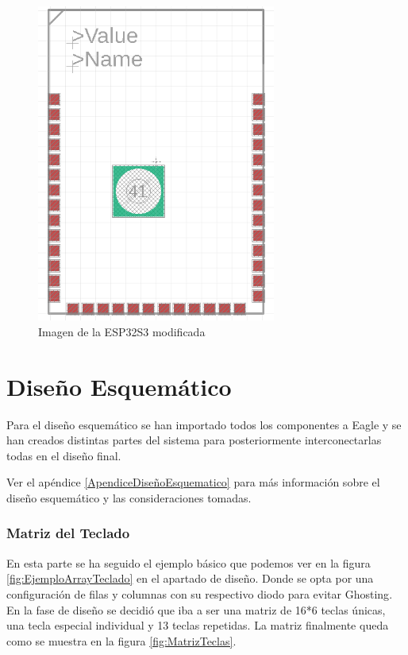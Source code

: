 \begin{figure}[H]
    \centering
    \includegraphics[width=0.7\textwidth]{imagenes/Capitulos/Cap04/ESP32S3HOLE.png}
    \caption{Imagen de la ESP32S3 modificada}
    \label{fig:ESP32S3HOLE}
\end{figure}

\newpage
\section{Diseño Esquemático}
Para el diseño esquemático se han importado todos los componentes a Eagle y se han creados distintas partes del sistema para posteriormente interconectarlas todas en el diseño final.

\begin{tcolorbox}[colback=blue!5!white, colframe=blue!55!white, title=Nota]
    Ver el apéndice \ref{ApendiceDiseñoEsquematico} para más información sobre el diseño esquemático y las consideraciones tomadas. 
\end{tcolorbox}

\subsubsection{Matriz del Teclado}
En esta parte se ha seguido el ejemplo básico que podemos ver en la figura \ref{fig:EjemploArrayTeclado} en el apartado de diseño. Donde se opta por una configuración de filas y columnas con su respectivo diodo para evitar \gls{Ghosting}. En la fase de diseño se decidió que iba a ser una matriz de 16*6 teclas únicas, una tecla especial individual y 13 teclas repetidas. La matriz finalmente queda como se muestra en la figura \ref{fig:MatrizTeclas}.

